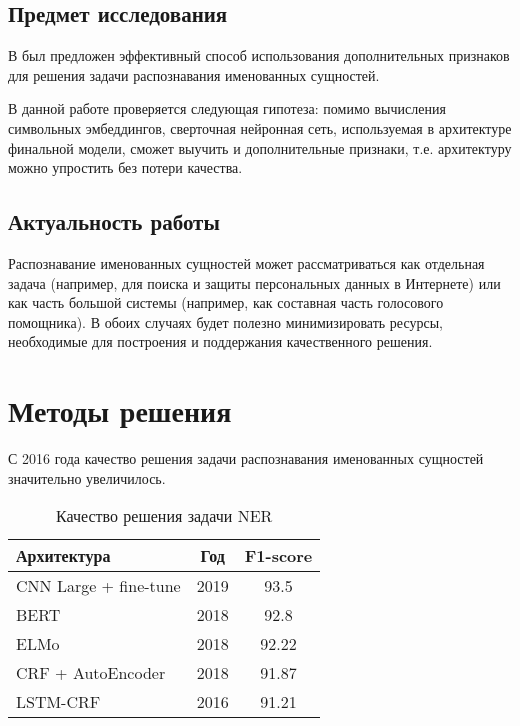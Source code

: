 \documentclass[a4paper,14pt]{extarticle}
\begin{document}
\subsection{Предмет исследования}

В \cite{1808.09075} был предложен эффективный способ использования дополнительных признаков для решения задачи распознавания именованных сущностей. 

В данной работе проверяется следующая гипотеза: помимо вычисления символьных эмбеддингов, сверточная нейронная сеть, используемая в архитектуре финальной модели, сможет выучить и дополнительные признаки, т.е. архитектуру можно упростить без потери качества.

\subsection{Актуальность работы}

Распознавание именованных сущностей может рассматриваться как отдельная задача (например, для поиска и защиты персональных данных в Интернете) или как часть большой системы (например, как составная часть голосового помощника). В обоих случаях будет полезно минимизировать ресурсы, необходимые для построения и поддержания качественного решения.

\clearpage

\section{Методы решения}

С 2016 года качество решения задачи распознавания именованных сущностей значительно увеличилось.

\begin{table}[H]
    \caption{Качество решения задачи NER}
    \label{progress}
    \begin{center}
    \begin{tabular}{l|c|c}
        Архитектура           & Год  & F1-score \\
        \hline
        CNN Large + fine-tune & 2019 & 93.5     \\
        BERT                  & 2018 & 92.8     \\
        ELMo                  & 2018 & 92.22    \\
        CRF + AutoEncoder     & 2018 & 91.87    \\
        LSTM-CRF              & 2016 & 91.21    \\
    \end{tabular}
    \end{center}
\end{table}
\end{document}
